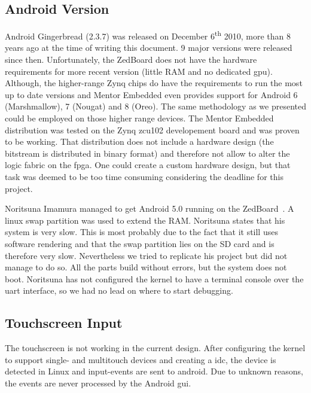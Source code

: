\subsection{Android Version}\label{ssec:issueandroidversion}
Android Gingerbread (2.3.7) was released on December 6\textsuperscript{th} 2010,
more than 8 years ago at the time of writing this document.
9 major versions were released since then.
Unfortunately, the ZedBoard does not have the hardware requirements for more
recent version (little RAM and no dedicated \gls{gpu}).
Although, the higher-range Zynq chips do have the requirements to run the most
up to date versions and Mentor Embedded even provides support for Android 6
(Marshmallow), 7 (Nougat) and 8 (Oreo).
The same methodology as we presented could be employed on those higher range
devices.
The Mentor Embedded distribution was tested on the Zynq zcu102 developement
board and was proven to be working.
That distribution does not include a hardware design (the bitstream is
distributed in binary format) and therefore not allow to alter the logic fabric
on the \gls{fpga}.
One could create a custom hardware design, but that task was deemed to be too
time consuming considering the deadline for this project.

Noritsuna Imamura managed to get Android 5.0 running on the
ZedBoard~\cite{noritsuna}.
A linux swap partition was used to extend the RAM.
Noritsuna states that his system is very slow.
This is most probably due to the fact that it still uses software rendering and
that the swap partition lies on the SD card and is therefore very slow.
Nevertheless we tried to replicate his project but did not manage to do so.
All the parts build without errors, but the system does not boot.
Noritsuna has not configured the kernel to have a terminal console over the
\gls{uart} interface, so we had no lead on where to start debugging.

\subsection{Touchscreen Input}\label{ssec:issuetouchscreen}
The touchscreen is not working in the current design.
After configuring the kernel to support single- and multitouch devices and
creating a \gls{idc}, the device is detected in Linux and input-events are sent
to android.
Due to unknown reasons, the events are never processed by the Android \gls{gui}.

